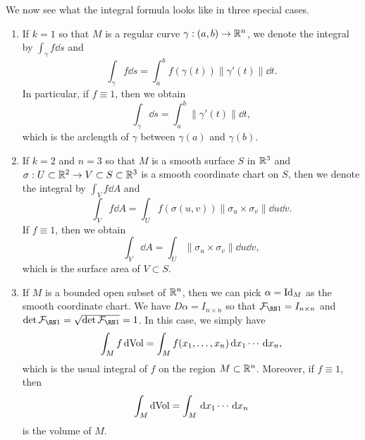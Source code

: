 We now see what the integral formula looks like in three special cases. 
\begin{enumerate}[(1)]
    \item If $k = 1$ so that $M$ is a regular curve $\gamma : (a, b) \to \mathbb{R}^n$, 
    we denote the integral by $\int_\gamma f\dd s$ and 
    \[ \int_\gamma f\dd s = \int_a^b f(\gamma(t))\|\gamma'(t)\|\dd t. \] 
    In particular, if $f \equiv 1$, then we obtain 
    \[ \int_\gamma \dd s = \int_a^b \|\gamma'(t)\| \dd t, \] 
    which is the arclength of $\gamma$ between $\gamma(a)$ and $\gamma(b)$.

    \item If $k = 2$ and $n = 3$ so that $M$ is a smooth surface $S$ in $\mathbb{R}^3$ 
    and $\sigma : U \subset \mathbb{R}^2 \to V \subset S \subset \mathbb{R}^3$ is a smooth 
    coordinate chart on $S$, then we denote the integral by $\int_V f\dd A$ 
    and 
    \[ \int_V f\dd A = \int_U f(\sigma(u, v)) \|\sigma_u \times \sigma_v\|\dd u \dd v. \] 
    If $f \equiv 1$, then we obtain 
    \[ \int_V \dd A = \int_U \|\sigma_u \times \sigma_v\|\dd u \dd v, \] 
    which is the surface area of $V \subset S$. 
    
    \item If $M$ is a bounded open subset of $\mathbb{R}^n$, then we can pick 
    $\alpha = \operatorname{Id}_M$ as the smooth coordinate chart. We have 
    $D\alpha = I_{n\times n}$ so that $\FFF = I_{n\times n}$ and 
    $\det\FFF = \sqrt{\det\FFF} = 1$. In this case, we simply have 
    \[ \int_M f\operatorname{dVol} = \int_M f(x_1, \dots, x_n) \,\mathrm{d} x_1 \cdots \,\mathrm{d} x_n, \] 
    which is the usual integral of $f$ on the region $M \subset \mathbb{R}^n$. 
    Moreover, if $f \equiv 1$, then 
    \[ \int_M \operatorname{dVol} = \int_M \,\mathrm{d} x_1 \cdots \,\mathrm{d} x_n \] 
    is the volume of $M$. 
    
\end{enumerate}

